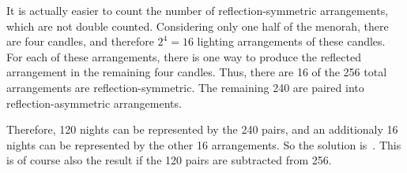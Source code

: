 \documentclass{article}
\begin{document}
It is actually easier to count the number of reflection-symmetric arrangements, which are not double counted.
Considering only one half of the menorah, there are four candles, and therefore $2^4=16$ lighting arrangements of these candles.
For each of these arrangements, there is one way to produce the reflected arrangement in the remaining four candles.
Thus, there are 16 of the 256 total arrangements are reflection-symmetric.
The remaining 240 are paired into reflection-asymmetric arrangements.

Therefore, 120 nights can be represented by the 240 pairs, and an additionaly 16 nights can be represented by the other 16 arrangements.
So the solution is
\,.
This is of course also the result if the 120 pairs are subtracted from 256.
\end{document}
